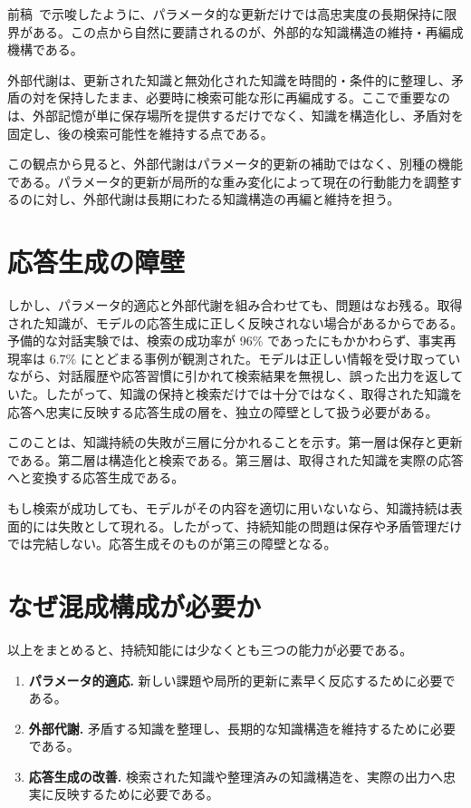 \documentclass[12pt,a4paper]{article}
\begin{document}
前稿~\cite{paper4}で示唆したように、パラメータ的な更新だけでは高忠実度の長期保持に限界がある。この点から自然に要請されるのが、外部的な知識構造の維持・再編成機構である。

外部代謝は、更新された知識と無効化された知識を時間的・条件的に整理し、矛盾の対を保持したまま、必要時に検索可能な形に再編成する。ここで重要なのは、外部記憶が単に保存場所を提供するだけでなく、知識を構造化し、矛盾対を固定し、後の検索可能性を維持する点である。

この観点から見ると、外部代謝はパラメータ的更新の補助ではなく、別種の機能である。パラメータ的更新が局所的な重み変化によって現在の行動能力を調整するのに対し、外部代謝は長期にわたる知識構造の再編と維持を担う。

\section{応答生成の障壁}

しかし、パラメータ的適応と外部代謝を組み合わせても、問題はなお残る。取得された知識が、モデルの応答生成に正しく反映されない場合があるからである。予備的な対話実験では、検索の成功率が 96\% であったにもかかわらず、事実再現率は 6.7\% にとどまる事例が観測された。モデルは正しい情報を受け取っていながら、対話履歴や応答習慣に引かれて検索結果を無視し、誤った出力を返していた。したがって、知識の保持と検索だけでは十分ではなく、取得された知識を応答へ忠実に反映する応答生成の層を、独立の障壁として扱う必要がある。

このことは、知識持続の失敗が三層に分かれることを示す。第一層は保存と更新である。第二層は構造化と検索である。第三層は、取得された知識を実際の応答へと変換する応答生成である。

もし検索が成功しても、モデルがその内容を適切に用いないなら、知識持続は表面的には失敗として現れる。したがって、持続知能の問題は保存や矛盾管理だけでは完結しない。応答生成そのものが第三の障壁となる。

\section{なぜ混成構成が必要か}

以上をまとめると、持続知能には少なくとも三つの能力が必要である。

\begin{enumerate}
  \item \textbf{パラメータ的適応.} 新しい課題や局所的更新に素早く反応するために必要である。
  \item \textbf{外部代謝.} 矛盾する知識を整理し、長期的な知識構造を維持するために必要である。
  \item \textbf{応答生成の改善.} 検索された知識や整理済みの知識構造を、実際の出力へ忠実に反映するために必要である。
\end{enumerate}
\end{document}
